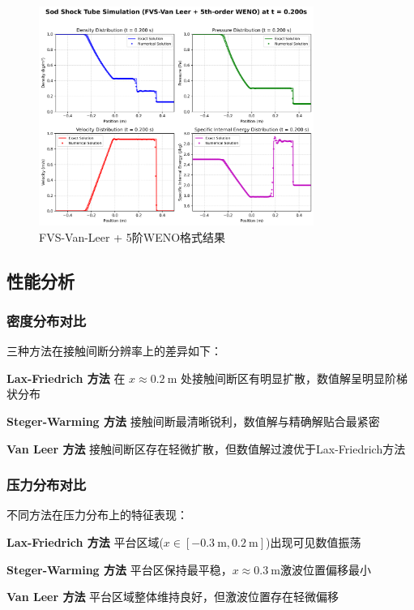 \documentclass[12pt,a4paper]{article}
\begin{document}
\begin{figure}[!htbp]
    \centering
    \includegraphics[width=0.8\textwidth]{Sod_Shock_FVS-Van Leer + 5th-order WENO_t_0p200s.png}
    \caption{FVS-Van-Leer + 5阶WENO格式结果}
\end{figure}

\subsection{性能分析}

\subsubsection{密度分布对比}
三种方法在接触间断分辨率上的差异如下：

\textbf{Lax-Friedrich 方法} 
在 $x \approx \SI{0.2}{\meter}$ 处接触间断区有明显扩散，数值解呈明显阶梯状分布

\textbf{Steger-Warming 方法}
接触间断最清晰锐利，数值解与精确解贴合最紧密

\textbf{Van Leer 方法}
接触间断区存在轻微扩散，但数值解过渡优于Lax-Friedrich方法

\subsubsection{压力分布对比}
不同方法在压力分布上的特征表现：

\textbf{Lax-Friedrich 方法}
平台区域($x \in [\SI{-0.3}{\meter}, \SI{0.2}{\meter}]$)出现可见数值振荡

\textbf{Steger-Warming 方法}
平台区保持最平稳，$x \approx \SI{0.3}{\meter}$激波位置偏移最小

\textbf{Van Leer 方法}
平台区域整体维持良好，但激波位置存在轻微偏移
\end{document}
